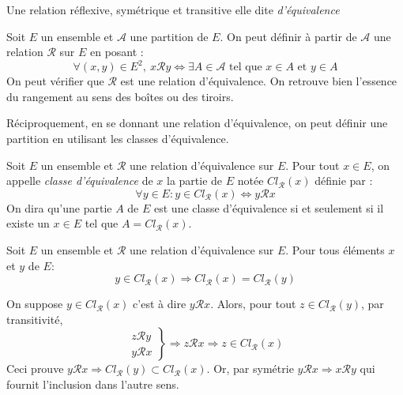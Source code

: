 \begin{defi}
 Une relation réflexive, symétrique et transitive elle dite \emph{d'équivalence}
\end{defi}

\begin{exple}
 Soit $E$ un ensemble et $\mathcal{A}$ une partition de $E$. On peut définir à partir de $\mathcal A$ une relation $\mathcal{R}$ sur $E$ en posant :
\begin{displaymath}
 \forall (x,y)\in E^2 ,\:
x\mathcal R y \Leftrightarrow \exists A \in \mathcal A \text{ tel que } x\in A \text{ et } y\in A
\end{displaymath}
On peut vérifier que $\mathcal R$ est une relation d'équivalence. On retrouve bien l'essence du rangement au sens des boîtes ou des tiroirs.
\end{exple}
Réciproquement, en se donnant une relation d'équivalence, on peut définir une partition en utilisant les classes d'équivalence.
\begin{defi}
 Soit $E$ un ensemble et $\mathcal R$ une relation d'équivalence sur $E$. Pour tout $x\in E$, on appelle \emph{classe d'équivalence} de $x$ la partie de $E$ notée $Cl_\mathcal{R}(x)$ définie par :
\begin{displaymath}
 \forall y\in E: y\in Cl_\mathcal{R}(x) \Leftrightarrow y \mathcal R x
\end{displaymath}
On dira qu'une partie $A$ de $E$ est une classe d'équivalence si et seulement si il existe un $x\in E$ tel que $A=Cl_\mathcal{R}(x)$.
\end{defi}
\begin{propn}\label{pclasse}
 Soit $E$ un ensemble et $\mathcal R$ une relation d'équivalence sur $E$. Pour tous éléments $x$ et $y$ de $E$:
 \begin{displaymath}
   y \in Cl_\mathcal{R}(x) \Rightarrow Cl_\mathcal{R}(x) = Cl_\mathcal{R}(y) 
 \end{displaymath}
\end{propn}
\begin{demo}
  On suppose $ y \in Cl_\mathcal{R}(x)$ c'est à dire $y \mathcal{R} x$. Alors, pour tout $z \in Cl_\mathcal{R}(y)$, par transitivité,
  \begin{displaymath}
  \left. 
  \begin{aligned}
    z \mathcal{R} y \\ y \mathcal{R} x
  \end{aligned}
\right\rbrace \Rightarrow z\mathcal{R} x \Rightarrow z \in Cl_\mathcal{R}(x)
  \end{displaymath}
Ceci prouve $y \mathcal{R} x \Rightarrow Cl_\mathcal{R}(y) \subset Cl_\mathcal{R}(x)$. Or, par symétrie $y \mathcal{R} x \Rightarrow x \mathcal{R} y$ qui fournit l'inclusion dans l'autre sens.
\end{demo}

